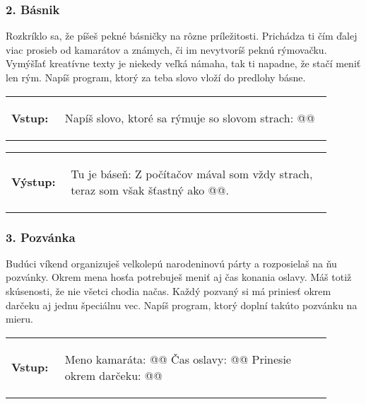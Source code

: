 \subsubsection*{2. Básnik}
Rozkríklo sa, že píšeš pekné básničky na rôzne príležitosti. Prichádza ti čím ďalej viac prosieb od kamarátov a známych, či im nevytvoríš peknú rýmovačku. Vymýšľať kreatívne texty je niekedy veľká námaha, tak ti napadne, že stačí meniť len rým. Napíš program, ktorý za teba slovo vloží do predlohy básne.

\begin{tabular}{@{}p{0.15\linewidth}p{0.75\linewidth}}
\textbf{\small Vstup:} &
\vspace{-3em}
\begin{code}
Napíš slovo, ktoré sa rýmuje so slovom strach: @\fbox{\phantom{slovo}}@
\end{code}
\end{tabular}

\vspace{-2em}
\begin{tabular}{@{}p{0.15\linewidth}p{0.75\linewidth}}
\textbf{\small Výstup:} &
\vspace{-3em}
\begin{code}
Tu je báseň:
Z počítačov mával som vždy strach,
teraz som však šťastný ako @\fbox{\phantom{slovo}}@.
\end{code}
\end{tabular}
\vspace{-2em}

\subsubsection*{3. Pozvánka}
Budúci víkend organizuješ velkolepú narodeninovú párty a rozposielaš na ňu pozvánky. Okrem mena hosťa potrebuješ meniť aj čas konania oslavy. Máš totiž skúsenosti, že nie všetci chodia načas. Každý pozvaný si má priniesť okrem darčeku aj jednu špeciálnu vec. Napíš program, ktorý doplní takúto pozvánku na mieru.

\begin{tabular}{@{}p{0.15\linewidth}p{0.75\linewidth}}
\textbf{\small Vstup:} &
\vspace{-3em}
\begin{code}
Meno kamaráta: @\fbox{\phantom{vstup}}@
Čas oslavy: @\fbox{\phantom{vstup}}@
Prinesie okrem darčeku: @\fbox{\phantom{vstup}}@
\end{code}
\end{tabular}

